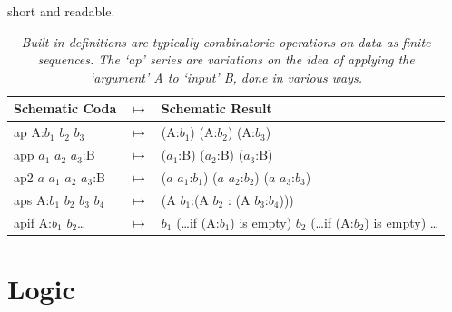 \documentclass[11pt]{article}
\begin{document}
short and readable.\cite{github}
\begin{table}
\begin{tabular}{| l  l  l | }
Schematic Coda & $\mapsto$ & Schematic Result \\
\hline
ap A:$b_1$ $b_2$ $b_3$ & $\mapsto$ & (A:$b_1$) (A:$b_2$) (A:$b_3$) \\
app $a_1$ $a_2$ $a_3$:B &  $\mapsto$ & ($a_1$:B) ($a_2$:B) ($a_3$:B) \\
ap2 $a$ $a_1$ $a_2$ $a_3$:B & $\mapsto$ & ($a$ $a_1$:$b_1$) ($a$ $a_2$:$b_2$) ($a$ $a_3$:$b_3$) \\
aps A:$b_1$ $b_2$ $b_3$ $b_4$ & $\mapsto$ & (A $b_1$:(A $b_2$ : (A $b_3$:$b_4$))) \\
apif A:$b_1$ $b_2$\dots & $\mapsto$ & $b_1$ (\dots if (A:$b_1$) is empty) $b_2$ (\dots if (A:$b_2$) is empty) \dots \\
\hline
\end{tabular}
\caption{\label{ }{\it Built in definitions are typically combinatoric operations on data as finite sequences.  The `ap' series are variations on the
idea of applying the `argument' A to `input' B, done in various ways.}}
\end{table}

\section{Logic}
\end{document}

